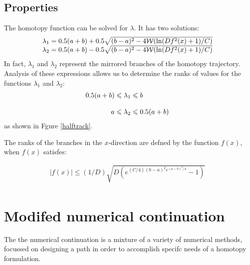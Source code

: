 \documentclass[conference]{IEEEtran}
\begin{document}
\subsection{Properties}

The homotopy function  can be solved for $\lambda$. It has two solutions:
{
\small
\begin{displaymath}
\begin{array}{c}
\lambda_1=0.5(a+b)+0.5\sqrt{(b-a)^2-4{\cal{W}}(\ln(Df^2(x)+1)/C)} \\
\lambda_2=0.5(a+b)-0.5\sqrt{(b-a)^2-4{\cal{W}}(\ln(Df^2(x)+1)/C)}
\end{array}
\end{displaymath}
}
In fact,  $\lambda_1$ and $\lambda_2$ represent the mirrored branches of
the  homotopy trajectory. Analysis of these expressions allows us to
determine the ranks of values for the functions  $\lambda_1$ and $\lambda_2$:
\begin{displaymath}
\begin{array}{l}
0.5(a+b) \leqslant \lambda_1 \leqslant b\\\\
\hspace{13mm}a \leqslant \lambda_2 \leqslant 0.5(a+b)
\end{array}
\end{displaymath}
as shown in Fgure \ref{halftrack}.\par


The ranks of the branches in the  $x$-direction  are defned by the function $f(x)$, when  $f(x)$ satisfes:

\begin{displaymath}
\begin{array}{l}
|f(x)|\leqslant(1/D)\sqrt{D(e^{(C/4)(b-a)^2 e^{(a-b)^2/4}}-1)}\\
\end{array}
\end{displaymath}



\section{Modifed numerical continuation}

The the numerical continuation is a mixture of a variety of numerical methods, focussed on designing 
a path in order to accomplish specifc needs of a homotopy formulation.\par
\end{document}
